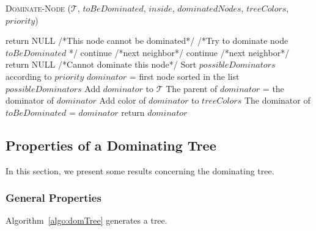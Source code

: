 \begin{algorithm}\caption{\textsc{Dominate-Node} ($\mathcal{T}$, $toBeDominated$,  $inside$, $dominatedNodes$, $treeColors$, $priority$)}\label{algo:domNode}
\begin{algorithmic}[1]
\begin{scriptsize}

 \label{algo-line:nodeom1}
\STATE return NULL /*This node cannot be dominated*/ \label{algo-line:nodeom2}
\ENDIF
\STATE /*Try to dominate node $toBeDominated$ */
	\STATE continue /*next neighbor*/	
	\ENDIF
	\label{line:noDom}
	\STATE continue \label{line:continue}/*next neighbor*/	
    \ELSE 
     \label{line:add}
    \ENDIF 
\ENDFOR 
{}
\STATE return NULL /*Cannot dominate this node*/
\ENDIF 
\STATE Sort $possibleDominators$ according to $priority$
\STATE $dominator$ = first node sorted in the list $possibleDominators$
\STATE Add $dominator$ to $\mathcal{T}$ \label{line:addT}
\STATE The parent of $dominator$ = the dominator of $dominator$
\STATE Add color of $dominator$ to $treeColors$
\STATE The dominator of $toBeDominated$ = $dominator$
\STATE return $dominator$
\end{scriptsize}\end{algorithmic}
\end{algorithm}



%
 \newpage
\subsection{Properties of a Dominating Tree}\label{sec:propoDomTree}
In this section, we present some results concerning the dominating tree. 


\subsubsection{General Properties}
\begin{theorem}
Algorithm~\ref{algo:domTree} generates a tree.
\end{theorem}

